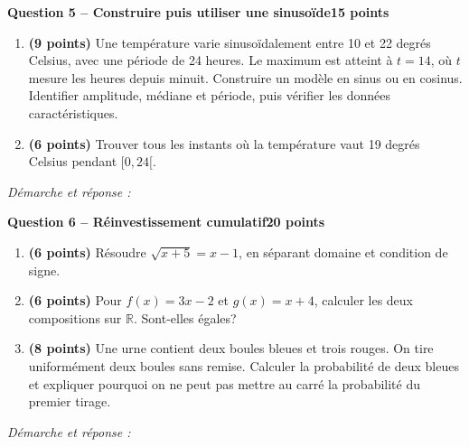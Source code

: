 \documentclass[11pt,a4paper]{article}
\begin{document}
\newpage
{\large\bfseries Question 5 -- Construire puis utiliser une sinusoïde}\hfill\textbf{15 points}\par
\begin{enumerate}
\item \textbf{(9 points)} Une température varie sinusoïdalement entre 10 et 22 degrés Celsius, avec une période de 24 heures. Le maximum est atteint à \(t=14\), où \(t\) mesure les heures depuis minuit. Construire un modèle en sinus ou en cosinus. Identifier amplitude, médiane et période, puis vérifier les données caractéristiques.
\item \textbf{(6 points)} Trouver tous les instants où la température vaut 19 degrés Celsius pendant \([0,24[\).
\end{enumerate}
\vspace{3mm}\textit{Démarche et réponse :}\par\vfill

\newpage
{\large\bfseries Question 6 -- Réinvestissement cumulatif}\hfill\textbf{20 points}\par
\begin{enumerate}
\item \textbf{(6 points)} Résoudre \(\sqrt{x+5}=x-1\), en séparant domaine et condition de signe.
\item \textbf{(6 points)} Pour \(f(x)=3x-2\) et \(g(x)=x+4\), calculer les deux compositions sur \(\mathbb R\). Sont-elles égales?
\item \textbf{(8 points)} Une urne contient deux boules bleues et trois rouges. On tire uniformément deux boules sans remise. Calculer la probabilité de deux bleues et expliquer pourquoi on ne peut pas mettre au carré la probabilité du premier tirage.
\end{enumerate}
\vspace{3mm}\textit{Démarche et réponse :}\par\vfill
\end{document}
